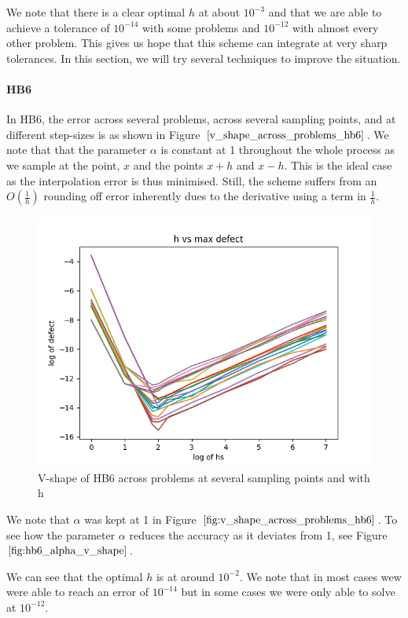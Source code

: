 \documentclass{article}
\begin{document}
We note that there is a clear optimal $h$ at about $10^{-3}$ and that we are able to achieve a tolerance of  $10^{-14}$ with some problems and $10^{-12}$ with almost every other problem. This gives us hope that this scheme can integrate at very sharp tolerances. In this section, we will try several techniques to improve the situation. 


\paragraph{HB6}
In HB6, the error across several problems, across several sampling points, and at different step-sizes is as shown in Figure $\ref{v_shape_across_problems_hb6}$. We note that that the parameter $\alpha$ is constant at 1 throughout the whole process as we sample at the point, $x$ and the points $x+h$ and $x-h$. This is the ideal case as the interpolation error is thus minimised. Still, the scheme suffers from an $O(\frac{1}{h})$ rounding off error inherently dues to the derivative using a term in $\frac{1}{h}$.

\begin{figure}[H]
\centering
\includegraphics[width=0.7\linewidth]{./figures/v_shape_across_problems_hb6}
\caption{V-shape of HB6 across problems at several sampling points and with h}
\label{fig:v_shape_across_problems_hb6}
\end{figure}

We note that $\alpha$ was kept at 1 in Figure $\ref{fig:v_shape_across_problems_hb6}$. To see how the parameter $\alpha$ reduces the accuracy as it deviates from 1, see Figure $\ref{fig:hb6_alpha_v_shape}$.

We can see that the optimal $h$ is at around $10^{-2}$. We note that in most cases wew were able to reach an error of $10^{-14}$ but in some cases we were only able to solve at $10^{-12}$. 
\end{document}
